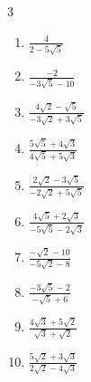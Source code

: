 \begin{multicols}{3}
\begin{enumerate}

  \item $\displaystyle \frac{4}{2-5\sqrt{5}}$


  \item $\displaystyle \frac{-2}{-3\sqrt{5}-10}$


  \item $\displaystyle \frac{4\sqrt{2}-\sqrt{5}}{-3\sqrt{2}+3\sqrt{5}}$


  \item $\displaystyle \frac{5\sqrt{5}+4\sqrt{3}}{4\sqrt{5}+5\sqrt{3}}$


\columnbreak %

\resetques

  \item $\displaystyle \frac{2\sqrt{2}-3\sqrt{5}}{-2\sqrt{2}+5\sqrt{5}}$


  \item $\displaystyle \frac{4\sqrt{5}+2\sqrt{3}}{-5\sqrt{5}-2\sqrt{3}}$


  \item $\displaystyle \frac{-\sqrt{2}-10}{-5\sqrt{2}-8}$


  \item $\displaystyle \frac{-3\sqrt{5}-2}{-\sqrt{5}+6}$


  \item $\displaystyle \frac{4\sqrt{3}+5\sqrt{2}}{\sqrt{3}+\sqrt{2}}$


\columnbreak %

  \item $\displaystyle \frac{5\sqrt{2}+3\sqrt{3}}{2\sqrt{2}-4\sqrt{3}}$


\end{enumerate}
\end{multicols}
